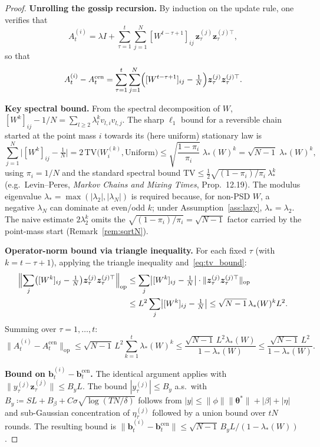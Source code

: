 \documentclass[11pt]{article}
\begin{document}
\begin{proof}
\textbf{Unrolling the gossip recursion.}
By induction on the update rule, one verifies that
\[
A_t^{(i)}=\lambda I+\sum_{\tau=1}^t\sum_{j=1}^N
[W^{t-\tau+1}]_{ij}\,\bm{z}_\tau^{(j)}\bm{z}_\tau^{(j)\top},
\]
so that
\[
A_t^{(i)}-A_t^{\mathrm{cen}}
=\sum_{\tau=1}^t\sum_{j=1}^N
\Bigl([W^{t-\tau+1}]_{ij}-\tfrac{1}{N}\Bigr)
\bm{z}_\tau^{(j)}\bm{z}_\tau^{(j)\top}.
\]

\textbf{Key spectral bound.}
From the spectral decomposition of $W$,
$[W^k]_{ij}-1/N=\sum_{l\geq 2}\lambda_l^k v_{l,i}v_{l,j}$.
The sharp $\ell_1$ bound for a reversible chain started at the point
mass $i$ towards its (here uniform) stationary law is
\begin{equation}
\sum_{j=1}^N\bigl|[W^k]_{ij}-\tfrac{1}{N}\bigr|
=2\,\mathrm{TV}\!\bigl(W_i^{(k)},\mathrm{Uniform}\bigr)
\leq\sqrt{\frac{1-\pi_i}{\pi_i}}\;\lambda_*(W)^k
=\sqrt{N-1}\;\lambda_*(W)^k,
\label{eq:tv_bound}
\end{equation}
using $\pi_i=1/N$ and the standard spectral bound
$\mathrm{TV}\leq\tfrac12\sqrt{(1-\pi_i)/\pi_i}\,\lambda_*^k$ (e.g.\
Levin--Peres, \emph{Markov Chains and Mixing Times}, Prop.~12.19).
The modulus eigenvalue $\lambda_*=\max(|\lambda_2|,|\lambda_N|)$ is
required because, for non-PSD $W$, a negative $\lambda_N$ can dominate
at even/odd $k$; under Assumption~\ref{ass:lazy}, $\lambda_*=\lambda_2$.
The naive estimate $2\lambda_2^k$ omits the
$\sqrt{(1-\pi_i)/\pi_i}=\sqrt{N-1}$ factor carried by the point-mass
start (Remark~\ref{rem:sqrtN}).

\textbf{Operator-norm bound via triangle inequality.}
For each fixed $\tau$ (with $k=t-\tau+1$), applying the triangle
inequality and~\eqref{eq:tv_bound}:
\begin{align*}
\Bigl\|\sum_{j}\bigl([W^k]_{ij}-\tfrac{1}{N}\bigr)
\bm{z}_\tau^{(j)}\bm{z}_\tau^{(j)\top}\Bigr\|_{\mathrm{op}}
&\leq\sum_{j}\bigl|[W^k]_{ij}-\tfrac{1}{N}\bigr|\cdot
\|\bm{z}_\tau^{(j)}\bm{z}_\tau^{(j)\top}\|_{\mathrm{op}}\\
&\leq L^2\sum_{j}\bigl|[W^k]_{ij}-\tfrac{1}{N}\bigr|
\leq\sqrt{N-1}\,\lambda_*(W)^k L^2.
\end{align*}
Summing over $\tau=1,\dots,t$:
\[
\|A_t^{(i)}-A_t^{\mathrm{cen}}\|_{\mathrm{op}}
\leq\sqrt{N-1}\,L^2\sum_{k=1}^t\lambda_*(W)^k
\leq\frac{\sqrt{N-1}\,L^2\lambda_*(W)}{1-\lambda_*(W)}
\leq\frac{\sqrt{N-1}\,L^2}{1-\lambda_*(W)}.
\]

\textbf{Bound on $\bm{b}_t^{(i)}-\bm{b}_t^{\mathrm{cen}}$.}
The identical argument applies with
$\|y_\tau^{(j)}\bm{z}_\tau^{(j)}\|\leq B_y L$.
The bound $|y_\tau^{(j)}|\leq B_y$ a.s.\ with
$B_y\coloneqq SL+B_\beta+C\sigma\sqrt{\log(TN/\delta)}$
follows from $|y|\leq\|\phi\|\|\bm{\theta}^{\!*}\|+|\beta|+|\eta|$
and sub-Gaussian concentration of $\eta_\tau^{(j)}$ followed by a
union bound over $tN$ rounds.  The resulting bound is
$\|\bm{b}_t^{(i)}-\bm{b}_t^{\mathrm{cen}}\|\leq
\sqrt{N-1}\,B_y L/(1-\lambda_*(W))$.
\end{proof}
\end{document}
